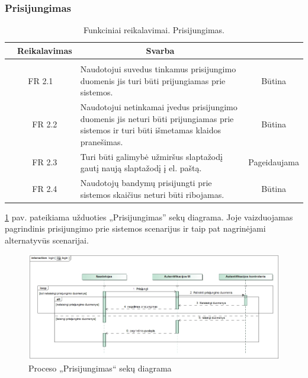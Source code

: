 \documentclass{VUMIFPSkursinis}
\begin{document}
\subsubsection{Prisijungimas}
\begin{table}[H]
	\caption{Funkciniai reikalavimai. Prisijungimas.}
	\begin{tabular}{|p{1cm}|p{1cm}|p{}|p{}|}
		\hline 
		\rowcolor{gray!50}
		\multicolumn{2}{|c|}{{\bfseries Kodas}}&
		\multicolumn{1}{c|}{{\bfseries Reikalavimas}}&
		\multicolumn{1}{c|}{{\bfseries Svarba}}\\
		\hline
		\rowcolor{lightgray}
		\multicolumn{4}{|c|}{Prisijungimas}\\		
		
		\hline
		\multicolumn{2}{|c|}{FR 2.1}&
		{Naudotojui suvedus tinkamus prisijungimo duomenis jis turi būti prijungiamas prie sistemos.
		}&		
		\multicolumn{1}{c|}{Būtina}\\
		\hline
		\multicolumn{1}{|c}{}&
		\multicolumn{1}{c|}{FR 2.2}&
		{Naudotojui netinkamai įvedus prisijungimo duomenis jis neturi būti prijungiamas prie sistemos ir turi būti išmetamas klaidos pranešimas.
		}&		
		\multicolumn{1}{c|}{Būtina}\\
		\hline
		\multicolumn{1}{|c}{}&
		\multicolumn{1}{c|}{FR 2.3}&
		{Turi būti galimybė užmiršus slaptažodį gautį naują slaptažodį į el. paštą.
		}&
		\multicolumn{1}{c|}{Pageidaujama}\\	
		\hline		
		\multicolumn{1}{|c}{}&
		\multicolumn{1}{c|}{FR 2.4}&
		{Naudotojų bandymų prisijungti prie sistemos skaičius neturi būti ribojamas.
		}&
		\multicolumn{1}{c|}{Būtina}\\									
		\hline
	\end{tabular}		
\end{table}
\ref{fig:login} pav. pateikiama užduoties „Prisijungimas” sekų diagrama. Joje vaizduojamas pagrindinis prisijungimo prie sistemos scenarijus ir taip pat nagrinėjami alternatyvūs scenarijai.
\begin{figure}[H]
	\centering
	\includegraphics[width=\linewidth]{img/login.jpg}
	\caption{Proceso „Prisijungimas“ sekų diagrama}
	\label{fig:login}
\end{figure}
\end{document}
